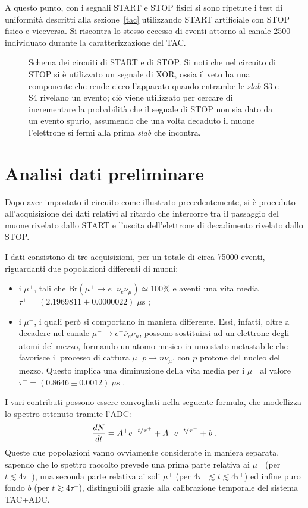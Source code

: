 \documentclass[10pt, oneside, a4paper]{article}   	%
\begin{document}
A questo punto, con i segnali START e STOP fisici si sono ripetute i test di uniformità descritti alla sezione~\ref{tac} utilizzando START artificiale con STOP fisico e viceversa. Si riscontra lo stesso eccesso di eventi attorno al canale 2500 individuato durante la caratterizzazione del TAC.
%
\begin{figure}[h]
	\centering
	
	\caption{Schema dei circuiti di START e di STOP. Si noti che nel circuito di STOP si è utilizzato un segnale di XOR, ossia il veto ha una componente che rende cieco l'apparato quando entrambe le \emph{slab} S3 e S4 rivelano un evento; ciò viene utilizzato per cercare di incrementare la probabilità che il segnale di STOP non sia dato da un evento spurio, assumendo che una volta decaduto il muone l'elettrone si fermi alla prima \emph{slab} che incontra.}
	\label{scemi}
\end{figure}
%
\section{Analisi dati preliminare}\label{analPrelim}
Dopo aver impostato il circuito come illustrato precedentemente, si è proceduto all'acquisizione dei dati relativi al ritardo che intercorre tra il passaggio del muone rivelato dallo START e l'uscita dell'elettrone di decadimento rivelato dallo STOP.

I dati consistono di tre acquisizioni, per un totale di circa 75000 eventi, riguardanti due popolazioni differenti di muoni:
\begin{itemize}
  \item i $\mu^+$, tali che $\mbox{Br}(\mu^+ \to e^+\nu_e\overline{\nu}_\mu)\simeq 100 \%$ e aventi una vita media \linebreak $\tau^+=(2.1969811 \pm 0.0000022)\;\mu\mbox{s}$ \cite{pdg};
  \item i $\mu^-$, i quali però si comportano in maniera differente. Essi, infatti, oltre a decadere nel canale $\mu^-\to e^-\overline{\nu}_e\nu_\mu$, possono sostituirsi ad un elettrone degli atomi del mezzo, formando un atomo mesico in uno stato metastabile che favorisce il processo di cattura $\mu^-p\to n\nu_\mu $, con $p$ protone del nucleo del mezzo. Questo implica una diminuzione della vita media per i $\mu^-$ al valore $\tau^-=(0.8646 \pm 0.0012) \ \mu \mbox{s}$ \cite{al}.
\end{itemize}

I vari contributi possono essere convogliati nella seguente formula, che modellizza lo spettro ottenuto tramite l'ADC:
 \[\frac{dN}{dt} = A^+ e^{-t/\tau^+} + A^- e^{-t/\tau^-} + \mbox{\emph{b\;.}} \]
Queste due popolazioni vanno ovviamente considerate in maniera separata, sapendo che lo spettro raccolto prevede una prima parte relativa ai $\mu^-$ (per $t\lesssim4\tau^-$), una seconda parte relativa ai soli $\mu^+$ (per $4\tau^-\lesssim t\lesssim 4\tau^+$) ed infine puro fondo $b$ (per $t\gtrsim4\tau^+$), distinguibili grazie alla calibrazione temporale del sistema TAC+ADC.
\end{document}
